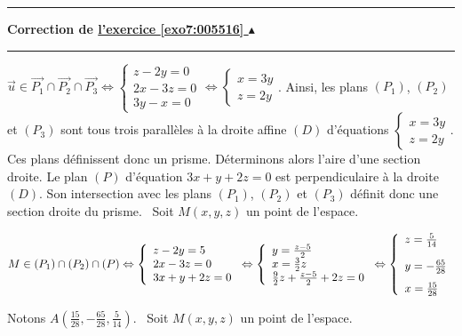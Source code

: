 \documentclass[11pt,a4paper]{article}
\newcounter{exo}
\newcommand{\correction}[1]{\hypertarget{cor7:#1}{}\label{cor7:#1}{\bf Correction de \hyperlink{exo7:#1}{l'exercice \ref{exo7:#1} $\blacktriangle$}}\vspace{1mm}\hrule\vspace{1mm}}
\newcommand{\fincorrection}{\vspace{1mm}\hrule\vspace*{7mm}}
\begin{document}
\begin{center}
\end{center}
\fincorrection
\correction{005516}
$\overrightarrow{u}\in\overrightarrow{P_1}\cap\overrightarrow{P_2}\cap\overrightarrow{P_3}\Leftrightarrow\left\{
\begin{array}{l}
z-2y=0\\
2x-3z=0\\
3y-x=0
\end{array}
\right.\Leftrightarrow\left\{
\begin{array}{l}
x=3y\\
z=2y
\end{array}
\right.$.
Ainsi, les plans $(P_1)$, $(P_2)$ et $(P_3)$ sont tous trois parallèles à la droite affine $(D)$ d'équations $\left\{
\begin{array}{l}
x=3y\\
z=2y
\end{array}
\right.$. Ces plans définissent donc un prisme.
Déterminons alors l'aire d'une section droite. Le plan $(P)$ d'équation $3x+y+2z=0$ est perpendiculaire à la droite $(D)$. Son intersection avec les plans $(P_1)$, $(P_2)$ et $(P_3)$ définit donc une section droite du prisme.
\textbullet~Soit $M(x,y,z)$ un point de l'espace.

\begin{center}
$M\in(P_1)\cap(P_2)\cap(P)\Leftrightarrow
\left\{
\begin{array}{l}
z-2y=5\\
2x-3z=0\\
3x+y+2z=0
\end{array}
\right.\Leftrightarrow\left\{
\begin{array}{l}
y=\frac{z-5}{2}\\
x=\frac{3}{2}z\\
\frac{9}{2}z+\frac{z-5}{2}+2z=0
\end{array}
\right.\Leftrightarrow\left\{
\begin{array}{l}
z=\frac{5}{14}\\
y=-\frac{65}{28}\rule[-4mm]{0mm}{11mm}\\
x=\frac{15}{28}
\end{array}
\right.$
\end{center}
Notons $A\left(\frac{15}{28},-\frac{65}{28},\frac{5}{14}\right)$.
\textbullet~Soit $M(x,y,z)$ un point de l'espace.
\end{document}
